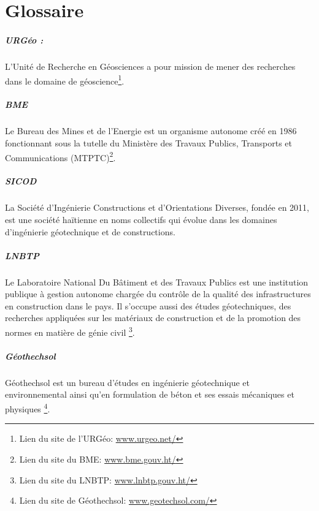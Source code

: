 \chapter*{Glossaire}
\paragraph{URGéo :}
L'Unité de Recherche en Géosciences a pour mission de mener des
recherches dans le domaine de géoscience\footnote{Lien du site de l'URGéo: \url{www.urgeo.net/}}.




\paragraph{BME}
Le Bureau des Mines et de l’Energie est un organisme autonome créé en 
1986 fonctionnant sous la tutelle du Ministère des Travaux Publics, Transports 
et Communications (MTPTC)\footnote{Lien du site du BME: \url{www.bme.gouv.ht/}}. 


\paragraph{SICOD}
La  Société d’Ingénierie Constructions et d’Orientations Diverses,
fondée en 2011, est une société haïtienne en noms collectifs qui évolue dans 
les domaines d’ingénierie géotechnique et de constructions.

\paragraph{LNBTP}
Le Laboratoire National Du Bâtiment et des Travaux Publics est une institution 
publique à gestion autonome chargée du contrôle de
la qualité des infrastructures en construction dans le pays. Il s'occupe 
aussi des études géotechniques, des recherches appliquées sur les matériaux de 
construction et de la promotion des normes en matière de génie civil
\footnote{Lien du site du LNBTP: \url{www.lnbtp.gouv.ht/}}. 


\paragraph{Géothechsol}
Géothechsol est un bureau d’études 
en ingénierie géotechni\-que et environnemental
ainsi qu’en formulation de béton et ses essais mécani\-ques et physiques
\footnote{Lien du site de Géothechsol: \url{www.geotechsol.com/}}.  

